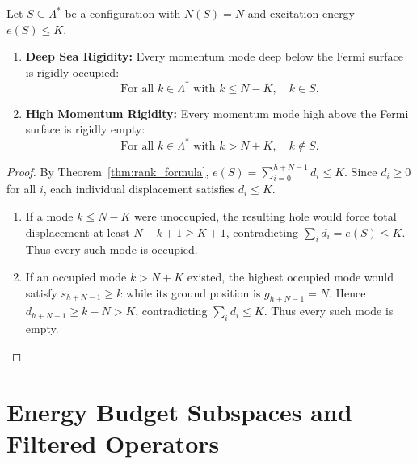 \begin{theorem}
\label{thm:frozen_margins}
Let $S \subseteq \Lambda^*$ be a configuration with $N(S) = N$ and excitation energy $e(S) \le K$.
\begin{enumerate}
    \item \textbf{Deep Sea Rigidity:} Every momentum mode deep below the Fermi surface is rigidly occupied:
    \begin{equation}
    \text{For all } k \in \Lambda^* \text{ with } k \le N - K, \quad k \in S.
    \end{equation}
    \item \textbf{High Momentum Rigidity:} Every momentum mode high above the Fermi surface is rigidly empty:
    \begin{equation}
    \text{For all } k \in \Lambda^* \text{ with } k > N + K, \quad k \notin S.
    \end{equation}
\end{enumerate}
\end{theorem}

\begin{proof}
By Theorem~\ref{thm:rank_formula}, $e(S) = \sum_{i=0}^{h+N-1} d_i \le K$. Since $d_i \ge 0$ for all $i$, each individual displacement satisfies $d_i \le K$.
\begin{enumerate}
    \item If a mode $k\le N-K$ were unoccupied, the resulting hole would force total displacement at least $N-k+1\ge K+1$, contradicting $\sum_i d_i=e(S)\le K$. Thus every such mode is occupied.
    \item If an occupied mode $k>N+K$ existed, the highest occupied mode would satisfy $s_{h+N-1}\ge k$ while its ground position is $g_{h+N-1}=N$. Hence $d_{h+N-1}\ge k-N>K$, contradicting $\sum_i d_i\le K$. Thus every such mode is empty.
\end{enumerate}
\end{proof}

\section{Energy Budget Subspaces and Filtered Operators}

